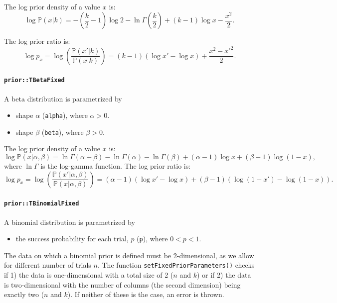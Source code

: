 \documentclass[a4paper,11pt]{article}
\def\p{\mathbb{P}}
\newcommand{\class}[1]{\texttt{#1}}
\newcommand{\privparam}[1]{\texttt{\textunderscore #1}}
\newcommand{\pubfunc}[1]{\texttt{#1()}}
\begin{document}
The log prior density of a value $x$ is:
\begin{equation*}
 \log \p(x|k) = -\left(\frac{k}{2} - 1\right) \log 2 - \ln \Gamma\left(\frac{k}{2}\right) + \left(k - 1 \right) \log x - \frac{x^2}{2}.
\end{equation*}

The log prior ratio is:
\begin{equation*}
 \log p_x = \log \left( \frac{\p(x'|k)}{\p(x|k)} \right) = \left(k - 1 \right) (\log x' - \log x) + \frac{x^2 - {x'}^2}{2}.
\end{equation*}

\paragraph{\class{prior::TBetaFixed}}
A beta distribution is parametrized by
\begin{itemize}
 \item shape $\alpha$ (\privparam{alpha}), where $\alpha > 0$.
 \item shape $\beta$ (\privparam{beta}), where $\beta > 0$.
\end{itemize}

The log prior density of a value $x$ is:
\begin{equation}\label{eq:priorDensBeta}
 \log \p(x|\alpha, \beta) = \ln \Gamma(\alpha + \beta) - \ln \Gamma(\alpha) - \ln\Gamma(\beta) + (\alpha - 1) \log x + (\beta - 1) \log(1-x),
\end{equation}
where $\ln \Gamma$ is the log-gamma function.
The log prior ratio is:
\begin{equation}\label{eq:priorRatioBeta}
 \log p_x = \log \left( \frac{\p(x'|\alpha, \beta)}{\p(x|\alpha, \beta)} \right) =  (\alpha - 1) (\log x' - \log x) + (\beta-1) (\log(1-x') - \log(1-x)).
\end{equation}

\paragraph{\class{prior::TBinomialFixed}}
A binomial distribution is parametrized by
\begin{itemize}
 \item the success probability for each trial, $p$ (\privparam{p}), where $0 < p < 1$.
\end{itemize}

The data on which a binomial prior is defined must be 2-dimensional, as we allow for different number of trials $n$. The function \pubfunc{setFixedPriorParameters} checks if 1) the data is one-dimensional with a total size of 2 ($n$ and $k$) or if 2) the data is two-dimensional with the number of columns (the second dimension) being exactly two ($n$ and $k$). If neither of these is the case, an error is thrown.
\end{document}
